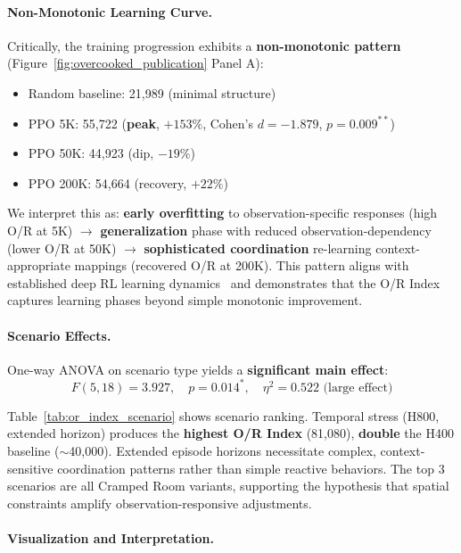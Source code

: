

\paragraph{Non-Monotonic Learning Curve.}

Critically, the training progression exhibits a \textbf{non-monotonic pattern} (Figure~\ref{fig:overcooked_publication} Panel A):
\begin{itemize}
    \item Random baseline: 21,989 (minimal structure)
    \item PPO 5K: 55,722 (\textbf{peak}, $+153\%$, Cohen's $d = -1.879$, $p = 0.009^{**}$)
    \item PPO 50K: 44,923 (dip, $-19\%$)
    \item PPO 200K: 54,664 (recovery, $+22\%$)
\end{itemize}

We interpret this as: \textbf{early overfitting} to observation-specific responses (high O/R at 5K) $\to$ \textbf{generalization} phase with reduced observation-dependency (lower O/R at 50K) $\to$ \textbf{sophisticated coordination} re-learning context-appropriate mappings (recovered O/R at 200K). This pattern aligns with established deep RL learning dynamics~\citep{henderson2018deep} and demonstrates that the O/R Index captures learning phases beyond simple monotonic improvement.

\paragraph{Scenario Effects.}

One-way ANOVA on scenario type yields a \textbf{significant main effect}:
\begin{equation}
F(5, 18) = 3.927, \quad p = 0.014^*, \quad \eta^2 = 0.522 \text{ (large effect)}
\end{equation}

Table~\ref{tab:or_index_scenario} shows scenario ranking. Temporal stress (H800, extended horizon) produces the \textbf{highest O/R Index} (81,080), \textbf{double} the H400 baseline ($\sim$40,000). Extended episode horizons necessitate complex, context-sensitive coordination patterns rather than simple reactive behaviors. The top 3 scenarios are all Cramped Room variants, supporting the hypothesis that spatial constraints amplify observation-responsive adjustments.

\paragraph{Visualization and Interpretation.}


